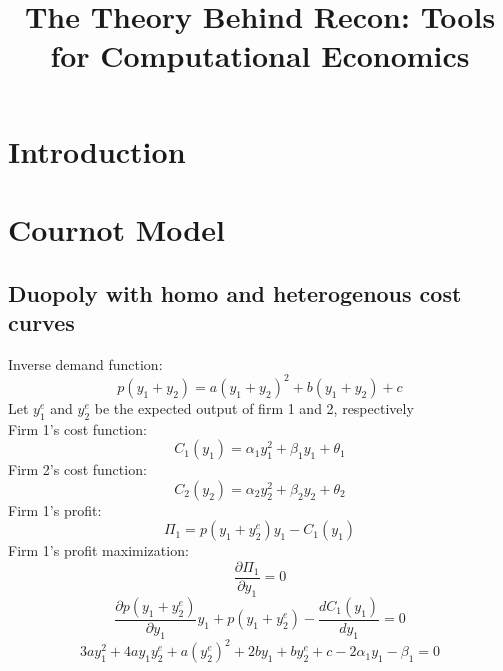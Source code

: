 \documentclass[11pt, a4paper]{article}
\title{The Theory Behind Recon: Tools for Computational Economics}
\author{Mateus Evangelsita\thanks{Departamento de Economia, Pontifícia Universidade Católica do Rio de Janeiro (PUC-Rio)} \and Pedro Cavalcante Oliveira\thanks{Faculdade de Economia, Universidade Federal Fluminense (UFF) \and Marcelo Gelati \thanks{Instituto Nacional de Matemática Pura e Aplicada (IMPA) \and Diego S. Cardoso \thanks{Dyson School of Management and Applied Economics, Cornell University}}}}
\begin{document}
\maketitle

\section{Introduction}

\section{Cournot Model}
\subsection{Duopoly with homo and heterogenous cost curves}

Inverse demand function:
\begin{equation*}
	p(y_{1} + y_{2}) = a(y_{1} + y_{2})^2 + b(y_{1} + y_{2})  + c
\end{equation*}
Let $y_{1}^e$ and $y_{2}^e$ be the expected output of firm 1 and 2, respectively \\
Firm 1's cost function:
\begin{equation*} 
	C_{1}(y_{1}) = \alpha _{1}y_{1}^2 + \beta _{1}y_{1} + \theta _{1}
\end{equation*}
Firm 2's cost function:
\begin{equation*}
	C_{2}(y_{2}) = \alpha _{2}y_{2}^2 + \beta _{2}y_{2} + \theta _{2}
\end{equation*}
Firm 1's profit:
\begin{equation*}
	\Pi _{1} = p(y_{1} + y_{2}^e)y_{1} - C_{1}(y_{1})
\end{equation*}
Firm 1's profit maximization:
\begin{equation*}
	\frac{\partial\Pi_{1}}{\partial y_{1}} = 0
\end{equation*}
\begin{equation*}
	\frac{\partial p(y_{1} + y_{2}^e)}{\partial y_{1}}y_{1} + p(y_{1} + y_{2}^e) - \frac{dC_{1}(y_{1})}{dy_{1}} = 0
\end{equation*}
\begin{equation*}
	3ay_{1}^2 + 4ay_{1}y_{2}^e + a(y_{2}^e)^2 + 2by_{1} + by_{2}^e + c - 2\alpha _{1}y_{1} - \beta _{1} = 0
\end{equation*}
\end{document}
